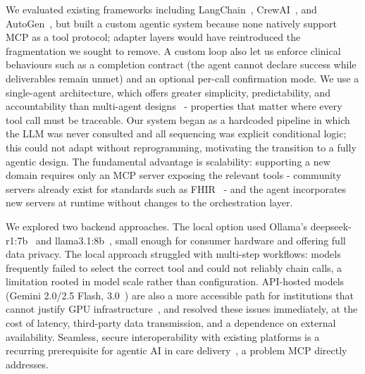 \documentclass[preprint,12pt]{elsarticle}
\begin{document}
We evaluated existing frameworks including LangChain~\cite{langchain}, CrewAI~\cite{crewai}, and AutoGen~\cite{autogen}, but built a custom agentic system because none natively support MCP as a tool protocol; adapter layers would have reintroduced the fragmentation we sought to remove. A custom loop also let us enforce clinical behaviours such as a completion contract (the agent cannot declare success while deliverables remain unmet) and an optional per-call confirmation mode. We use a single-agent architecture, which offers greater simplicity, predictability, and accountability than multi-agent designs~\cite{collaco2026scoping} - properties that matter where every tool call must be traceable. Our system began as a hardcoded pipeline in which the LLM was never consulted and all sequencing was explicit conditional logic; this could not adapt without reprogramming, motivating the transition to a fully agentic design. The fundamental advantage is scalability: supporting a new domain requires only an MCP server exposing the relevant tools - community servers already exist for standards such as FHIR~\cite{ehtesham2025mcpfhir} - and the agent incorporates new servers at runtime without changes to the orchestration layer.

We explored two backend approaches. The local option used Ollama's deepseek-r1:7b~\cite{deepseekr1} and llama3.1:8b~\cite{llama31}, small enough for consumer hardware and offering full data privacy. The local approach struggled with multi-step workflows: models frequently failed to select the correct tool and could not reliably chain calls, a limitation rooted in model scale rather than configuration. API-hosted models (Gemini 2.0/2.5 Flash, 3.0~\cite{gemini2025}) are also a more accessible path for institutions that cannot justify GPU infrastructure~\cite{agiformedicalimaging2025}, and resolved these issues immediately, at the cost of latency, third-party data transmission, and a dependence on external availability. Seamless, secure interoperability with existing platforms is a recurring prerequisite for agentic AI in care delivery~\cite{dietrich2025agentic}, a problem MCP directly addresses.
\end{document}
